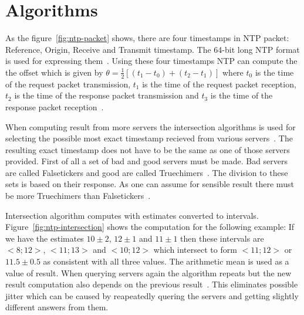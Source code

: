 
\section{Algorithms}


As the figure~\ref{fig:ntp-packet} shows, there are four timestamps
in NTP packet: Reference, Origin, Receive and Transmit timestamp.
The 64-bit long NTP format is used for expressing them~\cite{rfc5905}.
Using these four timestamps NTP can compute the
the offset which is given by $\theta = \frac{1}{2}[(t_1 - t_0) + (t_2 - t_1)]$
where $t_0$ is the time of the request packet transmission,
$t_1$ is the time of the request packet reception,
$t_2$ is the time of the response packet transmission and
$t_3$ is the time of the response packet reception~\cite{ntp-algor}.

When computing result from more servers the intersection algorithms is used
for selecting the possible most exact timestamp recieved from various servers~\cite{rfc5905}.
The resulting exact timestamp does not have to be the same
as one of those servers provided.
First of all a set of bad and good servers must be made.
Bad servers are called Falsetickers and good are called Truechimers~\cite{rfc5905}.
The division to these sets is based on their response.
As one can assume for sensible result there must be more Truechimers than Falsetickers~\cite{rfc5905}.

Intersection algorithm computes with estimates converted to intervals.
Figure~\ref{fig:ntp-intersection} shows the computation for the following example:
If we have the estimates $10 \pm 2$, $12 \pm 1$ and $11 \pm 1$
then these intervals are $<8; 12>$, $<11; 13>$ and $<10; 12>$ which
intersect to form $<11; 12>$ or $11.5 \pm 0.5$ as consistent with all three values.
The arithmetic mean is used as a value of result.
When querying servers again the algorithm repeats but the new result computation
also depends on the previous result~\cite{rfc5905}.
This eliminates possible jitter which can be caused by reapeatedly quering the servers
and getting slightly different answers from them.

